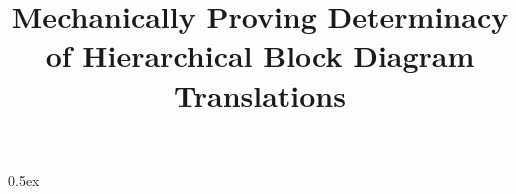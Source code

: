 \documentclass[11pt,a4paper]{article}
\begin{document}
\title{Mechanically Proving Determinacy of Hierarchical Block Diagram Translations}

\author{}

\maketitle

\tableofcontents

\parindent 0pt\parskip 0.5ex






%
\end{document}

